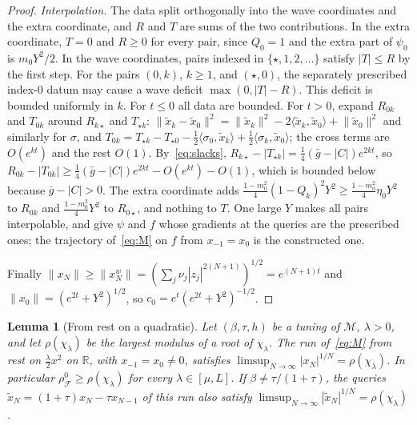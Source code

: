 \documentclass[11pt]{article}
\newtheorem{lemma}[theorem]{Lemma}
\theoremstyle{definition}
\theoremstyle{remark}
\newcommand{\R}{\mathbb R}
\newcommand{\cF}{\mathcal F}
\newcommand{\cM}{\mathcal M}
\newcommand{\ip}[2]{\langle #1,#2\rangle}
\newcommand{\norm}[1]{\lVert #1\rVert}
\newcommand{\rhoz}{\rho_{\cF}^{0}}
\begin{document}
\begin{proof}
\emph{Interpolation.}  The data split orthogonally into the wave coordinates
and the extra coordinate, and \(R\) and \(T\) are sums of the two contributions.
In the extra coordinate, \(T=0\) and \(R\ge0\) for every pair, since
\(Q_0=1\) and the extra part of \(\psi_0\) is \(m_0Y^2/2\).  In the
wave coordinates, pairs indexed in \(\{\star,1,2,\ldots\}\) satisfy \(|T|\le R\) by the
first step.  For the pairs \((0,k)\), \(k\ge1\), and \((\star,0)\), the separately
prescribed index-\(0\) datum may cause a wave deficit \(\max(0,|T|-R)\).  This
deficit is bounded uniformly in \(k\).  For \(t\le0\) all data are bounded.  For
\(t>0\), expand \(R_{0k}\) and \(T_{0k}\) around \(R_{k\star}\) and \(T_{\star k}\):
\(\norm{\tilde x_k-\tilde x_0}^2=\norm{\tilde x_k}^2-2\ip{\tilde x_k}{\tilde x_0}+\norm{\tilde x_0}^2\) and similarly for \(\sigma\), and
\(T_{0k}=T_{\star k}-T_{\star0}-\frac12\ip{\sigma_0}{\tilde x_k}+\frac12\ip{\sigma_k}{\tilde x_0}\); the cross terms are
\(O(e^{kt})\) and the rest \(O(1)\).  By~\eqref{eq:slacks},
\(R_{k\star}-|T_{\star k}|=\frac14(\bar g-|C|)e^{2kt}\), so
\(R_{0k}-|T_{0k}|\ge\frac14(\bar g-|C|)e^{2kt}-O(e^{kt})-O(1)\), which is bounded below because
\(\bar g-|C|>0\).  The extra coordinate adds \(\frac{1-m_0^2}4(1-Q_k)^2Y^2\ge\frac{1-m_0^2}4\eta_0Y^2\)
to \(R_{0k}\) and \(\frac{1-m_0^2}4Y^2\) to \(R_{0\star}\), and nothing to \(T\).  One large \(Y\) makes all
pairs interpolable, and  give \(\psi\) and \(f\) whose
gradients at the queries are the prescribed ones; the trajectory of~\eqref{eq:M}
on \(f\) from \(x_{-1}=x_0\) is the constructed one.

Finally \(\norm{x_N}\ge\norm{x^w_N}=(\sum_j\nu_j|z_j|^{2(N+1)})^{1/2}=e^{(N+1)t}\) and
\(\norm{x_0}=(e^{2t}+Y^2)^{1/2}\), so \(c_0=e^t(e^{2t}+Y^2)^{-1/2}\).
\end{proof}

\begin{lemma}[From rest on a quadratic]\label{lem:restquad}
Let \((\beta,\tau,h)\) be a tuning of \(\cM\), \(\lambda>0\), and let \(\rho(\chi_\lambda)\) be the largest modulus of a root of
\(\chi_\lambda\).  The run of~\eqref{eq:M} from rest on \(\frac\lambda2x^2\) on \(\R\), with \(x_{-1}=x_0\ne0\), satisfies
\(\limsup_{N\to\infty}|x_N|^{1/N}=\rho(\chi_\lambda)\).  In particular \(\rhoz\ge\rho(\chi_\lambda)\) for every \(\lambda\in[\mu,L]\).  If
\(\beta\ne\tau/(1+\tau)\), the queries \(\tilde x_N=(1+\tau)x_N-\tau x_{N-1}\) of this run also satisfy \(\limsup_{N\to\infty}|\tilde x_N|^{1/N}=\rho(\chi_\lambda)\).
\end{lemma}
\end{document}
